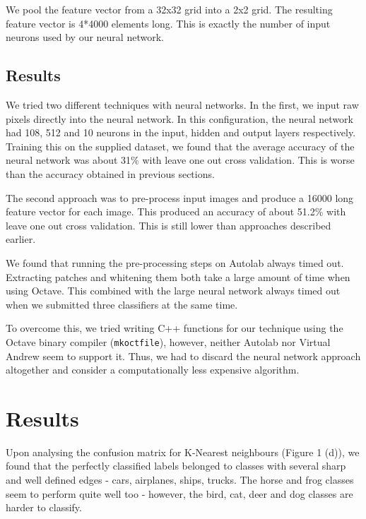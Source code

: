 \documentclass{article} %
\begin{document}
        We pool the feature vector from a 32x32 grid into a 2x2 grid. The resulting feature vector is 4*4000 elements long. This is exactly the number of input neurons used by our neural network.


    \subsection{Results} %
    \label{sub:Results}
        We tried two different techniques with neural networks. In the first, we input raw pixels directly into the neural network. In this configuration, the neural network had 108, 512 and 10 neurons in the input, hidden and output layers respectively. Training this on the supplied dataset, we found that the average accuracy of the neural network was about 31\% with leave one out cross validation. This is worse than the accuracy obtained in previous sections.

        The second approach was to pre-process input images and produce a 16000 long feature vector for each image. This produced an accuracy of about 51.2\% with leave one out cross validation. This is still lower than approaches described earlier.

        We found that running the pre-processing steps on Autolab always timed out. Extracting patches and whitening them both take a large amount of time when using Octave. This combined with the large neural network always timed out when we submitted three classifiers at the same time.

        To overcome this, we tried writing C++ functions for our technique using the Octave binary compiler (\texttt{mkoctfile}), however, neither Autolab nor Virtual Andrew seem to support it. Thus, we had to discard the neural network approach altogether and consider a computationally less expensive algorithm.

\section{Results} %
\label{sub:Results}
    Upon analysing the confusion matrix for K-Nearest neighbours (Figure 1 (d)), we found that the perfectly classified labels belonged to classes with several sharp and well defined edges - cars, airplanes, ships, trucks. The horse and frog classes seem to perform quite well too - however, the bird, cat, deer and dog classes are harder to classify.
\end{document}
